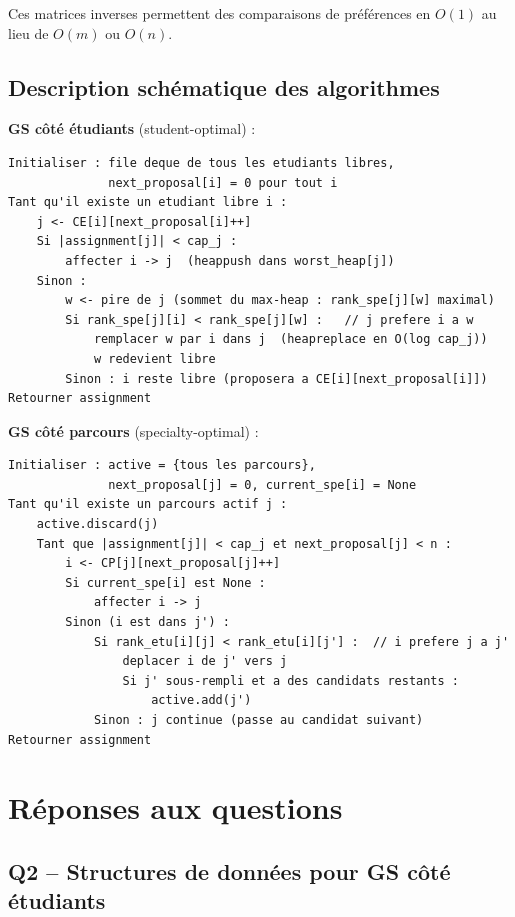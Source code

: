 \documentclass[11pt,a4paper]{article}
\begin{document}
Ces matrices inverses permettent des comparaisons de préférences en $O(1)$ au lieu de $O(m)$ ou $O(n)$.

\subsection{Description schématique des algorithmes}

\textbf{GS côté étudiants} (student-optimal) :

\begin{lstlisting}[language={},mathescape=true]
Initialiser : file deque de tous les etudiants libres,
              next_proposal[i] = 0 pour tout i
Tant qu'il existe un etudiant libre i :
    j <- CE[i][next_proposal[i]++]
    Si |assignment[j]| < cap_j :
        affecter i -> j  (heappush dans worst_heap[j])
    Sinon :
        w <- pire de j (sommet du max-heap : rank_spe[j][w] maximal)
        Si rank_spe[j][i] < rank_spe[j][w] :   // j prefere i a w
            remplacer w par i dans j  (heapreplace en O(log cap_j))
            w redevient libre
        Sinon : i reste libre (proposera a CE[i][next_proposal[i]])
Retourner assignment
\end{lstlisting}

\textbf{GS côté parcours} (specialty-optimal) :

\begin{lstlisting}[language={},mathescape=true]
Initialiser : active = {tous les parcours},
              next_proposal[j] = 0, current_spe[i] = None
Tant qu'il existe un parcours actif j :
    active.discard(j)
    Tant que |assignment[j]| < cap_j et next_proposal[j] < n :
        i <- CP[j][next_proposal[j]++]
        Si current_spe[i] est None :
            affecter i -> j
        Sinon (i est dans j') :
            Si rank_etu[i][j] < rank_etu[i][j'] :  // i prefere j a j'
                deplacer i de j' vers j
                Si j' sous-rempli et a des candidats restants :
                    active.add(j')
            Sinon : j continue (passe au candidat suivant)
Retourner assignment
\end{lstlisting}

\section{Réponses aux questions}

\subsection*{Q2 -- Structures de données pour GS côté étudiants}
\end{document}
